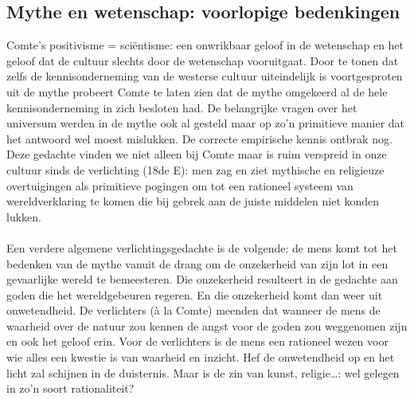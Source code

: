 \documentclass[11pt,a4paper]{article}
\begin{document}
\subsection{Mythe en wetenschap: voorlopige bedenkingen}
Comte's positivisme = sci\"entisme: een onwrikbaar geloof in de wetenschap en het geloof dat de cultuur slechts door de wetenschap vooruitgaat. 
Door te tonen dat zelfs de kennisonderneming van de westerse cultuur uiteindelijk is voortgesproten uit de mythe probeert Comte te laten zien dat de mythe omgekeerd al de hele kennisonderneming in zich besloten had. De belangrijke vragen over het universum werden in de mythe ook al gesteld maar op zo'n primitieve manier dat het antwoord wel moest mislukken. De correcte empirische kennis ontbrak nog. Deze gedachte vinden we niet alleen bij Comte maar is ruim verspreid in onze cultuur sinds de verlichting (18de E): men zag en ziet mythische en religieuze overtuigingen als primitieve pogingen om tot een rationeel systeem van wereldverklaring te komen die bij gebrek aan de juiste middelen niet konden lukken.
\\
\\
Een verdere algemene verlichtingsgedachte is de volgende: de mens komt tot het bedenken van de mythe vanuit de drang om de onzekerheid van zijn lot in een gevaarlijke wereld te bemeesteren. Die onzekerheid resulteert in de gedachte aan goden die het wereldgebeuren regeren. En die onzekerheid komt dan weer uit onwetendheid. De verlichters (\`a la Comte) meenden dat wanneer de mens de waarheid over de natuur zou kennen de angst voor de goden zou weggenomen zijn en ook het geloof erin. Voor de verlichters is de mens een rationeel wezen voor wie alles een kwestie is van waarheid en inzicht. Hef de onwetendheid op en het licht zal schijnen in de duisternis.
Maar is de zin van kunst, religie…: wel gelegen in zo'n soort rationaliteit?
\end{document}
